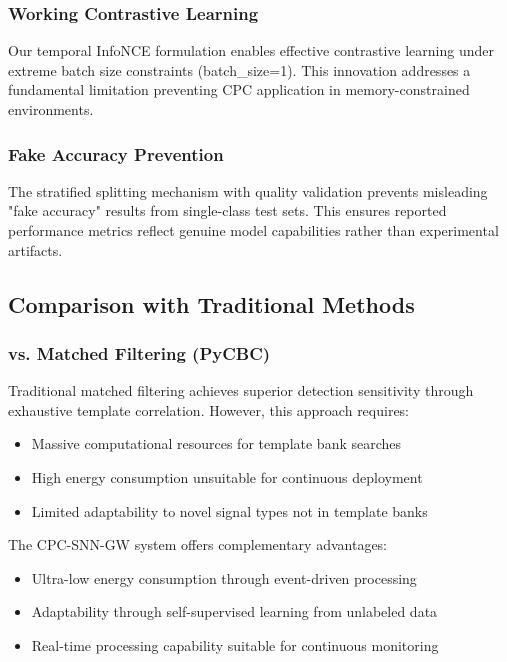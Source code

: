 \documentclass[12pt,a4paper]{article}
\begin{document}
\subsubsection{Working Contrastive Learning}

Our temporal InfoNCE formulation enables effective contrastive learning under extreme batch size constraints (batch\_size=1). This innovation addresses a fundamental limitation preventing CPC application in memory-constrained environments.

\subsubsection{Fake Accuracy Prevention}

The stratified splitting mechanism with quality validation prevents misleading "fake accuracy" results from single-class test sets. This ensures reported performance metrics reflect genuine model capabilities rather than experimental artifacts.

\subsection{Comparison with Traditional Methods}

\subsubsection{vs. Matched Filtering (PyCBC)}

Traditional matched filtering achieves superior detection sensitivity through exhaustive template correlation. However, this approach requires:
\begin{itemize}
\item Massive computational resources for template bank searches
\item High energy consumption unsuitable for continuous deployment
\item Limited adaptability to novel signal types not in template banks
\end{itemize}

The CPC-SNN-GW system offers complementary advantages:
\begin{itemize}
\item Ultra-low energy consumption through event-driven processing
\item Adaptability through self-supervised learning from unlabeled data
\item Real-time processing capability suitable for continuous monitoring
\end{itemize}
\end{document}

